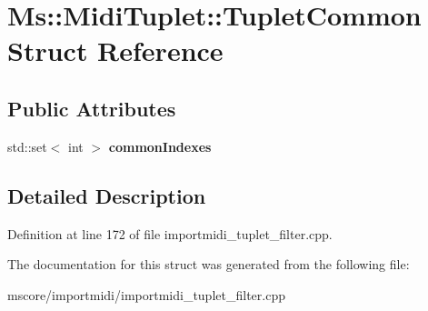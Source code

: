 \hypertarget{struct_ms_1_1_midi_tuplet_1_1_tuplet_common}{}\section{Ms\+:\+:Midi\+Tuplet\+:\+:Tuplet\+Common Struct Reference}
\label{struct_ms_1_1_midi_tuplet_1_1_tuplet_common}
\subsection*{Public Attributes}
\begin{DoxyCompactItemize}
\item 
\mbox{\label{struct_ms_1_1_midi_tuplet_1_1_tuplet_common_af3ece2eba4e988fb59032d6346b40d5d}} 
std\+::set$<$ int $>$ {\bfseries common\+Indexes}
\end{DoxyCompactItemize}


\subsection{Detailed Description}


Definition at line 172 of file importmidi\+\_\+tuplet\+\_\+filter.\+cpp.



The documentation for this struct was generated from the following file\+:\begin{DoxyCompactItemize}
\item 
mscore/importmidi/importmidi\+\_\+tuplet\+\_\+filter.\+cpp\end{DoxyCompactItemize}

